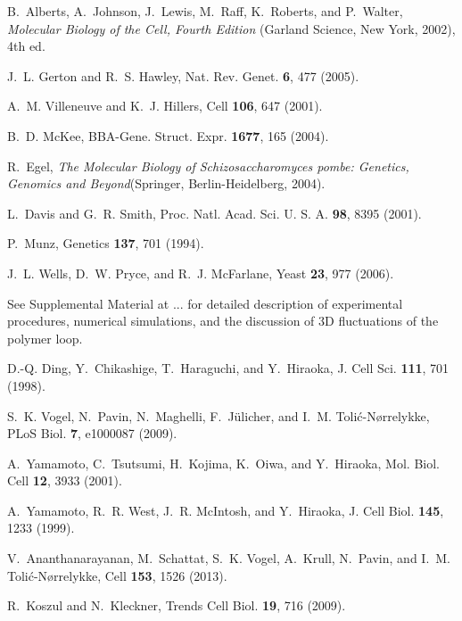 \documentclass[aps,showpacs,twocolumn,floatfix,prx,superscriptaddress]{revtex4-1}
\begin{document}
\begin{thebibliography}{10}


B.~Alberts,
  A.~Johnson,
  J.~Lewis,
  M.~Raff,
  K.~Roberts, and
  P.~Walter,
  \emph{Molecular Biology of the Cell, Fourth Edition}
  (Garland Science, New York, 2002),
  4th ed.

J.~L. Gerton and
  R.~S. Hawley,
  Nat. Rev. Genet. \textbf{6},
  477 (2005).

A.~M. Villeneuve
  and K.~J.
  Hillers, Cell
  \textbf{106}, 647 (2001).

B.~D. McKee,
  BBA-Gene. Struct. Expr. \textbf{1677}, 165 
  (2004).

R.~Egel,
  \emph{The Molecular Biology of Schizosaccharomyces pombe:
  Genetics, Genomics and Beyond}(Springer, Berlin-Heidelberg,
  2004).

L.~Davis and
  G.~R. Smith,
  Proc. Natl. Acad. Sci. U. S. A.
  \textbf{98}, 8395 (2001).

P.~Munz,
  Genetics \textbf{137},
  701 (1994).

J.~L. Wells,
  D.~W. Pryce, and
  R.~J. McFarlane,
  Yeast \textbf{23}, 977
  (2006).
  
  See Supplemental Material at ... for detailed description of experimental procedures, numerical simulations, and the discussion of 3D fluctuations of the polymer loop.

D.-Q. Ding,
  Y.~Chikashige,
  T.~Haraguchi,
  and Y.~Hiraoka,
  J. Cell Sci. \textbf{111},
  701 (1998).

S.~K. Vogel,
  N.~Pavin,
  N.~Maghelli,
  F.~J\"ulicher,
  and I.~M.
  Toli\'c-N\o rrelykke, PLoS Biol.
  \textbf{7}, e1000087
  (2009).

A.~Yamamoto,
  C.~Tsutsumi,
  H.~Kojima,
  K.~Oiwa, and
  Y.~Hiraoka,
  Mol. Biol. Cell \textbf{12},
  3933 (2001).

A.~Yamamoto,
  R.~R. West,
  J.~R. McIntosh,
  and Y.~Hiraoka,
  J. Cell Biol.
  \textbf{145}, 1233 (1999).

V.~Ananthanarayanan,
  M.~Schattat,
  S.~K. Vogel,
  A.~Krull,
  N.~Pavin, and
  I.~M. Toli\'c-N\o rrelykke,
  Cell \textbf{153}, 1526
  (2013).

R.~Koszul and
  N.~Kleckner,
  Trends Cell Biol. \textbf{19},
  716 (2009).


\end{thebibliography}
\end{document}
